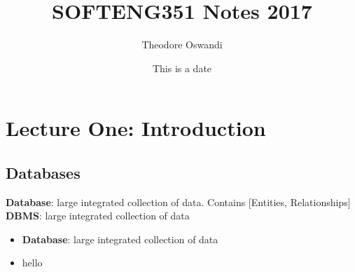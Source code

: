 \documentclass{article}
\title{SOFTENG351 Notes 2017}
\author{Theodore Oswandi}
\date{This is a date}
\begin{document}
 \maketitle{} 

\section{Lecture One: Introduction}
	\subsection{Databases}
		\textbf{Database}: large integrated collection of data. 
		\newline Contains [Entities, Relationships] 
		\newline \newline
		\textbf{DBMS}: large integrated collection of data



		\begin{itemize}
			\item \textbf{Database}: large integrated collection of data
			\item hello

		\end{itemize}
\end{document}
